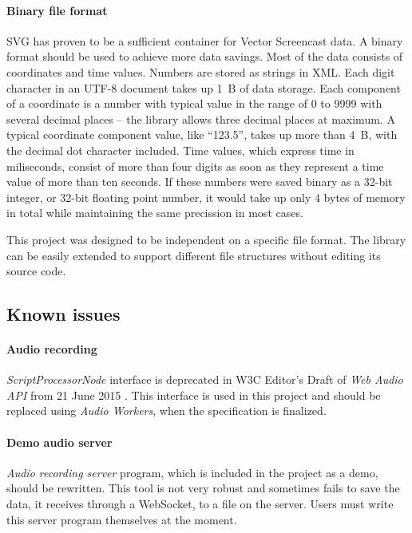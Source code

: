 \paragraph{Binary file format}
SVG has proven to be a sufficient container for Vector Screencast data. A binary format should be used to achieve more data savings. Most of the data consists of coordinates and time values. Numbers are stored as strings in XML. Each digit character in an UTF-8 document takes up 1~B of data storage. Each component of a coordinate is a number with typical value in the range of 0 to 9999 with several decimal places -- the library allows three decimal places at maximum. A typical coordinate component value, like ``123.5'', takes up more than 4~B, with the decimal dot character included. Time values, which express time in miliseconds, consist of more than four digits as soon as they represent a time value of more than ten seconds. If these numbers were saved binary as a 32-bit integer, or 32-bit floating point number, it would take up only 4 bytes of memory in total while maintaining the same precission in most cases.

This project was designed to be independent on a specific file format. The library can be easily extended to support different file structures without editing its source code.

\subsection*{Known issues}
\paragraph{Audio recording} \textit{ScriptProcessorNode} interface is deprecated in W3C Editor's Draft of \textit{Web Audio API} from 21 June 2015 \cite{mic_deprecated}. This interface is used in this project and should be replaced using \textit{Audio Workers}, when the specification is finalized\cite{audio_workers}. 

\paragraph{Demo audio server} \textit{Audio recording server} program, which is included in the project as a demo, should be rewritten. This tool is not very robust and sometimes fails to save the data, it receives through a WebSocket, to a file on the server. Users must write this server program themselves at the moment.